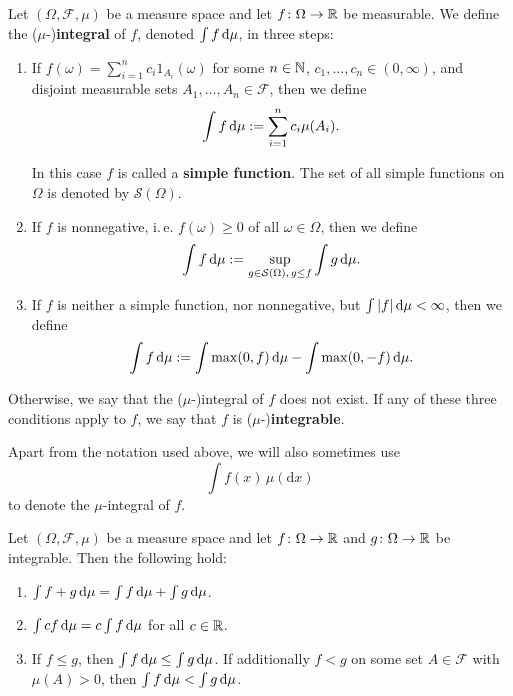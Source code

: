 \begin{definition}
    Let $(\Omega, \mathcal{F}, \mu)$ be a measure space and let $f\colon \Omega \to \mathbb{R}$ be measurable. We define the ($\mu$-)\textbf{integral} of $f$, denoted $\int f \, \textnormal{d}\mu$, in three steps:
    \begin{enumerate}
        \item If $f(\omega) = \sum_{i=1}^n c_i 1_{A_i}(\omega)$ for some $n\in\mathbb{N}$, $c_1, \dots, c_n \in (0,\infty)$, and disjoint measurable sets $A_1, \dots, A_n\in\mathcal{F}$, then we define
        \begin{align*}
            \int f \, \textnormal{d}\mu := \sum_{i=1}^n c_i \mu(A_i).
        \end{align*}

        In this case $f$ is called a \textbf{simple function}. The set of all simple functions on $\Omega$ is denoted by $\mathcal{S}(\Omega)$.

        \item If $f$ is nonnegative, i.\,e. $f(\omega) \geq 0$ of all $\omega\in\Omega$, then we define
        \begin{align*}
            \int f \, \textnormal{d}\mu := \sup_{g \in \mathcal{S}(\Omega), \, g \leq f} \int g \, \textnormal{d}\mu.
        \end{align*}

        \item If $f$ is neither a simple function, nor nonnegative, but $\int |f| \, \textnormal{d}\mu < \infty$, then we define
        \begin{align*}
            \int f \, \textnormal{d}\mu := \int \max(0, f) \, \textnormal{d}\mu - \int \max(0, -f) \, \textnormal{d}\mu.
        \end{align*}
    \end{enumerate}
    Otherwise, we say that the ($\mu$-)integral of $f$ does not exist. If any of these three conditions apply to $f$, we say that $f$ is ($\mu$-)\textbf{integrable}.
\end{definition}

Apart from the notation used above, we will also sometimes use
\[
    \int f(x) \, \mu(\text{d}x)
\]
to denote the $\mu$-integral of $f$.

\begin{proposition}
    \label{prop:integrals}
    Let $(\Omega, \mathcal{F}, \mu)$ be a measure space and let $f\colon \Omega \to \mathbb{R}$ and
    $g\colon \Omega \to \mathbb{R}$ be integrable. Then the following hold:
    \begin{enumerate}
        \item[(i)] $\int f + g \, \textnormal{d}\mu = \int f \, \textnormal{d}\mu + \int g \, \textnormal{d}\mu$.
        \item[(ii)] $\int c f \, \textnormal{d}\mu = c \int f \, \textnormal{d}\mu$ for all $c\in\mathbb{R}$.
        \item[(iii)] If $f \leq g$, then $\int f \, \textnormal{d}\mu \leq \int g \, \textnormal{d}\mu$. If additionally $f < g$ on some set $A\in\mathcal{F}$ with $\mu(A) > 0$, then $\int f \, \textnormal{d}\mu < \int g \, \textnormal{d}\mu$.
    \end{enumerate}
\end{proposition}

